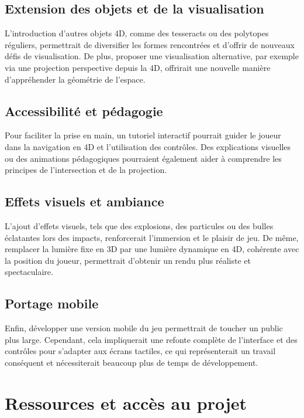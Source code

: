 \documentclass[11pt,a4paper]{article}
\begin{document}
\subsection{Extension des objets et de la visualisation}

L’introduction d’autres objets 4D, comme des tesseracts ou des polytopes réguliers, permettrait de diversifier les formes rencontrées et d’offrir de nouveaux défis de visualisation. De plus, proposer une visualisation alternative, par exemple via une projection perspective depuis la 4D, offrirait une nouvelle manière d’appréhender la géométrie de l’espace.

\subsection{Accessibilité et pédagogie}

Pour faciliter la prise en main, un tutoriel interactif pourrait guider le joueur dans la navigation en 4D et l’utilisation des contrôles. Des explications visuelles ou des animations pédagogiques pourraient également aider à comprendre les principes de l’intersection et de la projection.

\subsection{Effets visuels et ambiance}

L’ajout d’effets visuels, tels que des explosions, des particules ou des bulles éclatantes lors des impacts, renforcerait l’immersion et le plaisir de jeu. De même, remplacer la lumière fixe en 3D par une lumière dynamique en 4D, cohérente avec la position du joueur, permettrait d’obtenir un rendu plus réaliste et spectaculaire.

\subsection{Portage mobile}

Enfin, développer une version mobile du jeu permettrait de toucher un public plus large. Cependant, cela impliquerait une refonte complète de l’interface et des contrôles pour s’adapter aux écrans tactiles, ce qui représenterait un travail conséquent et nécessiterait beaucoup plus de temps de développement.

\section{Ressources et accès au projet}
\end{document}
